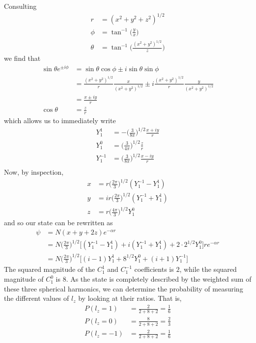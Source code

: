 \documentclass[../principles-of-quantum-mechanics.tex]{subfiles}
\begin{document}
\begin{questions}
		\begin{solution}
			Consulting 
			\begin{align*}
				r &= (x^2 + y^2 + z^2)^{1/2} \\
				\phi &= \tan^{-1}\Big(\frac{y}{x}\Big) \\
				\theta &= \tan^{-1}\Big(\frac{(x^2 + y^2)^{1/2}}{z}\Big)
			\end{align*}
			we find that
			\begin{align*}
				\sin\theta e^{\pm i\phi} &= \sin\theta\cos\phi \pm i\sin\theta\sin\phi \\
				&= \frac{(x^2 + y^2)^{1/2}}{r}\frac{x}{(x^2 + y^2)^{1/2}} \pm i\frac{(x^2 + y^2)^{1/2}}{r}\frac{y}{(x^2 + y^2)^{1/2}} \\
				&= \frac{x \pm iy}{r} \\
				\cos\theta &= \frac{z}{r}
			\end{align*}
			which allows us to immediately write
			\begin{align*}
				Y_1^{1} &= {-\Big(\frac{3}{8\pi}\Big)^{1/2}}\frac{x+ iy}{r} \\
				Y_1^0 &= \Big(\frac{3}{4\pi}\Big)^{1/2}\frac{z}{r} \\
				Y_1^{-1} &= \Big(\frac{3}{8\pi}\Big)^{1/2}\frac{x- iy}{r} \\
			\end{align*}
			Now, by inspection, 
			\begin{align*}
				x &= r\Big(\frac{2\pi}{3}\Big)^{1/2}(Y_1^{-1} - Y_1^1) \\
				y &= ir\Big(\frac{2\pi}{3}\Big)^{1/2}(Y_1^{-1} + Y_1^1) \\
				z &= r\Big(\frac{4\pi}{3}\Big)^{1/2}Y_1^0
			\end{align*}
			and so our state can be rewritten as
			\begin{align*}
				\psi &= N(x + y + 2z)e^{-\alpha r} \\
				&= N\Big(\frac{2\pi}{3}\Big)^{1/2}\Big[(Y_1^{-1} - Y_1^1) + i(Y_1^{-1} + Y_1^1) + 2\cdot2^{1/2}Y_1^0\Big]re^{-\alpha r} \\
				&= N\Big(\frac{2\pi}{3}\Big)^{1/2}\Big[(i - 1)Y_1^1 + 8^{1/2}Y_1^0 + (i + 1)Y_1^{-1}\Big]
			\end{align*}
			The squared magnitude of the $C_1^1$ and $C_1^{-1}$ coefficients is $2$, while the squared magnitude of $C_1^0$ is $8$. As the state is completely described by the weighted sum of these three spherical harmonics, we can determine the probability of measuring the different values of $l_z$ by looking at their ratios. That is,
			\begin{align*}
				P(l_z = 1) &= \frac{2}{2 + 8 + 2} = \frac{1}{6} \\
				P(l_z = 0) &= \frac{8}{2 + 8 + 2} = \frac{2}{3} \\
				P(l_z = {-1}) &= \frac{2}{2 + 8 + 2} = \frac{1}{6}
			\end{align*}
		\end{solution}
		

\end{questions}
\end{document}
